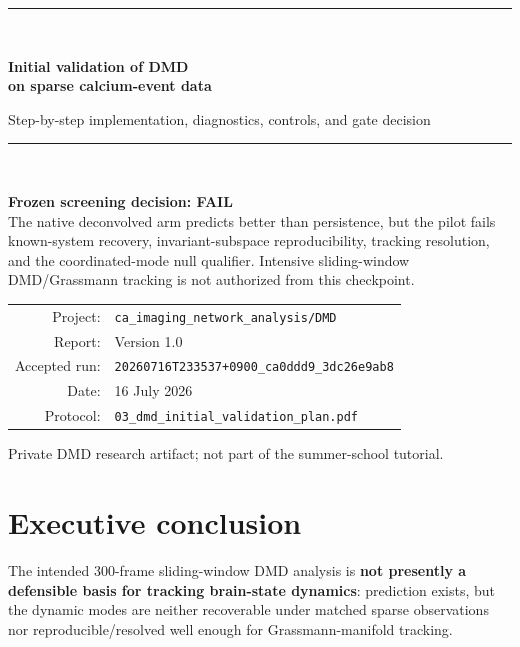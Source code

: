 \documentclass[11pt,a4paper]{article}
\newcommand{\runid}{20260716T233537+0900\_ca0ddd9\_3dc26e9ab8}
\begin{document}
\hypersetup{pageanchor=false}

\begin{titlepage}
  \centering
  \vspace*{1.2cm}
  {\color{navy}\rule{\textwidth}{1.2pt}}\\[0.9cm]
  {\Huge\bfseries Initial validation of DMD\\[0.15em]
  on sparse calcium-event data\par}
  \vspace{0.45cm}
  {\Large Step-by-step implementation, diagnostics, controls, and gate decision\par}
  \vspace{0.8cm}
  {\color{navy}\rule{\textwidth}{0.6pt}}\\[0.8cm]

  \begin{tcolorbox}[colback=redpale,colframe=orange,width=0.94\textwidth,arc=2pt]
  \centering
  {\Large\bfseries Frozen screening decision: FAIL}\\[0.4em]
  The native deconvolved arm predicts better than persistence, but the pilot
  fails known-system recovery, invariant-subspace reproducibility, tracking
  resolution, and the coordinated-mode null qualifier. Intensive sliding-window
  DMD/Grassmann tracking is not authorized from this checkpoint.
  \end{tcolorbox}

  \vfill
  \begin{tabular}{rl}
    Project: & \texttt{ca\_imaging\_network\_analysis/DMD}\\
    Report: & Version 1.0\\
    Accepted run: & \texttt{\runid}\\
    Date: & 16 July 2026\\
    Protocol: & \texttt{03\_dmd\_initial\_validation\_plan.pdf}
  \end{tabular}
  \vfill
  {\small Private DMD research artifact; not part of the summer-school tutorial.}
\end{titlepage}

\hypersetup{pageanchor=true}
\tableofcontents
\clearpage
{}

\section{Executive conclusion}

\begin{failbox}
The intended 300-frame sliding-window DMD analysis is \textbf{not presently a
defensible basis for tracking brain-state dynamics}: prediction exists, but the
dynamic modes are neither recoverable under matched sparse observations nor
reproducible/resolved well enough for Grassmann-manifold tracking.
\end{failbox}
\end{document}
